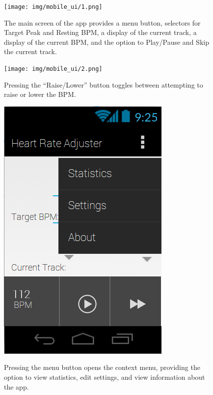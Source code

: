 \documentclass[letterpaper,english, 12pt]{scrreprt}
\begin{document}
\begin{figure}[H]
	\centering
	\texttt{[image: img/mobile\_ui/1.png]}\\
	\caption{The main screen of the app provides a menu button, selectors for Target Peak and Resting BPM, a display of the current track, a display of the current BPM, and the option to Play/Pause and Skip the current track.}
\end{figure}

\begin{figure}[H]
	\centering
	\texttt{[image: img/mobile\_ui/2.png]}\\
	\caption{Pressing the ``Raise/Lower'' button toggles between attempting to raise or lower the BPM.}
\end{figure}

\begin{figure}[H]
	\centering
	\includegraphics{img/mobile_ui/3.png}\\
	\caption{Pressing the menu button opens the context menu, providing the option to view statistics, edit settings, and view information about the app.}
\end{figure}
\end{document}
